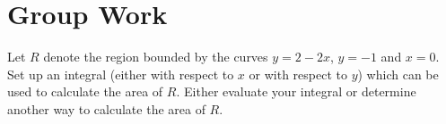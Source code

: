 \documentclass[handout]{ximera}
\begin{document}
\begin{freeResponse}

\end{freeResponse}



\section{Group Work}

\begin{problem}
Let $R$ denote the region bounded by the curves $y=2-2x$, $y=-1$ and $x=0$. Set up an integral (either with respect to $x$ or with respect to $y$) which can be used to calculate the area of $R$. Either evaluate your integral or determine another way to calculate the area of $R$. 
\end{problem}

\begin{freeResponse}

\end{freeResponse}
\end{document}
